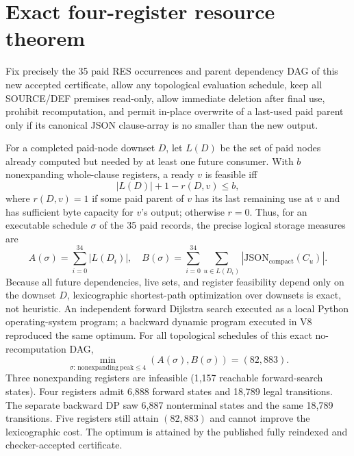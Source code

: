 \documentclass[11pt]{article}
\begin{document}
\section*{Exact four-register resource theorem}
Fix precisely the 35 paid RES occurrences and parent dependency DAG of this new accepted certificate, allow any topological evaluation schedule, keep all SOURCE/DEF premises read-only, allow immediate deletion after final use, prohibit recomputation, and permit in-place overwrite of a last-used paid parent only if its canonical JSON clause-array is no smaller than the new output.

For a completed paid-node downset $D$, let $L(D)$ be the set of paid nodes already computed but needed by at least one future consumer. With $b$ nonexpanding whole-clause registers, a ready $v$ is feasible iff
\[
|L(D)|+1-r(D,v)\leq b,
\]
where $r(D,v)=1$ if some paid parent of $v$ has its last remaining use at $v$ and has sufficient byte capacity for $v$'s output; otherwise $r=0$. Thus, for an executable schedule $\sigma$ of the 35 paid records, the precise logical storage measures are
\[
A(\sigma)=\sum_{i=0}^{34}|L(D_i)|,\quad
B(\sigma)=\sum_{i=0}^{34}\sum_{u\in L(D_i)}
|\mathrm{JSON}_{\mathrm{compact}}(C_u)|.
\]
Because all future dependencies, live sets, and register feasibility depend only on the downset $D$, lexicographic shortest-path optimization over downsets is exact, not heuristic. An independent forward Dijkstra search executed as a local Python operating-system program; a backward dynamic program executed in V8 reproduced the same optimum. For all topological schedules of this exact no-recomputation DAG,
\[
\boxed{\min_{\sigma:\,\mathrm{nonexpanding\ peak}\le4}
(A(\sigma),B(\sigma))=(82,883).}
\]
Three nonexpanding registers are infeasible (1,157 reachable forward-search states). Four registers admit 6,888 forward states and 18,789 legal transitions. The separate backward DP saw 6,887 nonterminal states and the same 18,789 transitions. Five registers still attain $(82,883)$ and cannot improve the lexicographic cost. The optimum is attained by the published fully reindexed and checker-accepted certificate.
\end{document}
